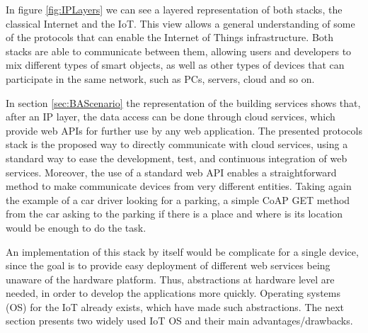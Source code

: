 In figure \ref{fig:IPLayers} we can see a layered representation of both stacks, the classical Internet and the IoT.
This view allows a general understanding of some of the protocols that can enable the Internet of Things infrastructure.
Both stacks are able to communicate between them, allowing users and developers to mix different types of smart objects, as well as other types of devices that can participate in the same network, such as PCs, servers, cloud and so on.

In section \ref{sec:BAScenario} the representation of the building services shows that, after an IP layer, the data access can be done through cloud services, which provide web APIs for further use by any web application.
The presented protocols stack is the proposed way to directly communicate with cloud services, using a standard way to ease the development, test, and continuous integration of web services.
Moreover, the use of a standard web API enables a straightforward method to make communicate devices from very different entities.
Taking again the example of a car driver looking for a parking, a simple CoAP GET method from the car asking to the parking if there is a place and where is its location would be enough to do the task.

An implementation of this stack by itself would be complicate for a single device, since the goal is to provide easy deployment of different web services being unaware of the hardware platform.
Thus, abstractions at hardware level are needed, in order to develop the applications more quickly.
Operating systems (OS) for the IoT already exists, which have made such abstractions.
The next section presents two widely used IoT OS and their main advantages/drawbacks.



